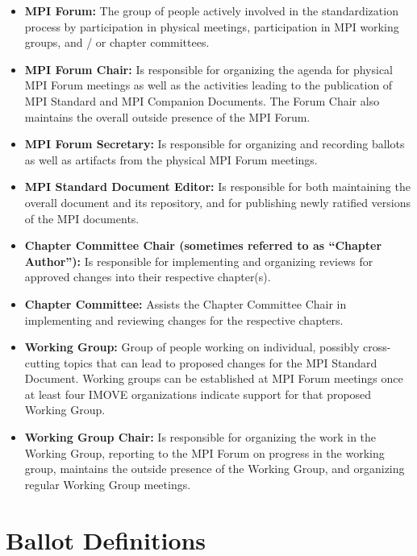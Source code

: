 \begin{itemize}
\item {\bf MPI Forum:} The group of people actively involved in the
  standardization process by participation in physical meetings,
  participation in MPI working groups, and / or chapter committees.
\item {\bf MPI Forum Chair:} Is responsible for organizing the agenda
  for physical MPI Forum meetings as well as the activities leading to the
  publication of MPI Standard and MPI Companion Documents. The Forum
  Chair also maintains the overall outside presence of the MPI Forum.
\item {\bf MPI Forum Secretary:} Is responsible for organizing and
  recording ballots as well as artifacts from the physical MPI Forum
  meetings.
\item {\bf MPI Standard Document Editor:} Is responsible for both
  maintaining the overall document and its repository, and for
  publishing newly ratified versions of the MPI documents.
\item {\bf Chapter Committee Chair (sometimes referred to as ``Chapter
  Author''):} Is responsible for implementing and organizing reviews
  for approved changes into their respective chapter(s).
\item {\bf Chapter Committee:} Assists the Chapter Committee Chair in
  implementing and reviewing changes for the respective chapters.
\item {\bf Working Group:} Group of people working on individual,
  possibly cross-cutting topics that can lead to proposed changes for
  the MPI Standard Document. Working groups can be established at MPI
  Forum meetings once {\color{red}at least four IMOVE organizations indicate
  support for that proposed Working Group.}
\item {\bf Working Group Chair:} Is responsible for organizing the
  work in the Working Group, reporting to the MPI Forum on progress in
  the working group, maintains the outside presence of the Working
  Group, and organizing regular Working Group meetings.
\end{itemize}

\section{Ballot Definitions}

